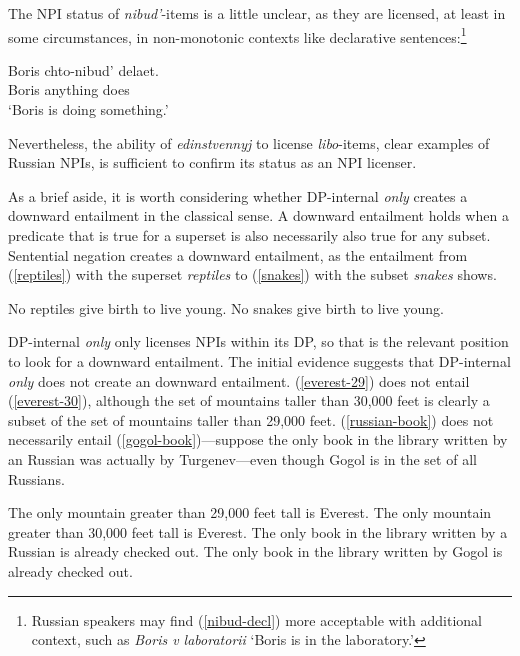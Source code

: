 \documentclass{article}
\begin{document}
The NPI status of \textit{nibud'}-items is a little unclear, as they are licensed, at least in some circumstances, in non-monotonic contexts like declarative sentences:\footnote{Russian speakers may find (\ref{nibud-decl}) more acceptable with additional context, such as \textit{Boris v laboratorii} `Boris is in the laboratory.'}

\begin{exe}
	\ex \label{nibud-decl} \gll Boris chto-nibud' delaet.\\
	Boris anything does\\
	\glt `Boris is doing something.' %
\end{exe}

Nevertheless, the ability of \textit{edinstvennyj} to license \textit{libo}-items, clear examples of Russian NPIs, is sufficient to confirm its status as an NPI licenser.

As a brief aside, it is worth considering whether DP-internal \textit{only} creates a downward entailment in the classical sense. A downward entailment holds when a predicate that is true for a superset is also necessarily also true for any subset. Sentential negation creates a downward entailment, as the entailment from (\ref{reptiles}) with the superset \textit{reptiles} to (\ref{snakes}) with the subset \textit{snakes} shows.

\begin{exe}
	\ex \label{reptiles} No reptiles give birth to live young.
	\ex \label{snakes} No snakes give birth to live young.
\end{exe}

DP-internal \textit{only} only licenses NPIs within its DP, so that is the relevant position to look for a downward entailment. The initial evidence suggests that DP-internal \textit{only} does not create an downward entailment. (\ref{everest-29}) does not entail (\ref{everest-30}), although the set of mountains taller than 30,000 feet is clearly a subset of the set of mountains taller than 29,000 feet. (\ref{russian-book}) does not necessarily entail (\ref{gogol-book})---suppose the only book in the library written by an Russian was actually by Turgenev---even though Gogol is in the set of all Russians.

\begin{exe}
	\ex \label{everest-29} The only mountain greater than 29,000 feet tall is Everest.
	\ex \label{everest-30} The only mountain greater than 30,000 feet tall is Everest.
	\ex \label{russian-book} The only book in the library written by a Russian is already checked out.
	\ex \label{gogol-book} The only book in the library written by Gogol is already checked out.
\end{exe}
\end{document}
